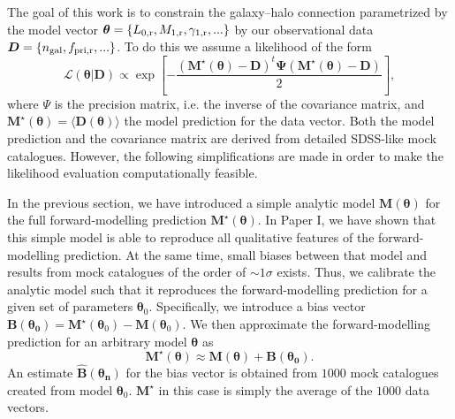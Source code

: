 \documentclass[fleqn,usenatbib,useAMS]{mnras}
\begin{document}
The goal of this work is to constrain the galaxy--halo connection parametrized by the model vector $\boldsymbol{\theta} = \{L_{0, \rm r}, M_{1, \rm r}, \gamma_{1, \rm r}, ...\}$ by our observational data $\boldsymbol{D} = \{n_{\rm gal}, f_{\rm pri, r}, ...\}$. To do this we assume a likelihood of the form
\begin{equation}
	\mathcal{L}(\boldsymbol{\theta} | \boldsymbol{D}) \propto \exp \left[ - \frac{(\boldsymbol{M}^\star (\boldsymbol{\theta}) - \boldsymbol{D})^t \boldsymbol{\Psi} (\boldsymbol{M}^\star (\boldsymbol{\theta}) - \boldsymbol{D})}{2} \right],
	\label{eq:likelihood}
\end{equation}
where $\Psi$ is the precision matrix, i.e. the inverse of the covariance matrix, and $\boldsymbol{M}^\star (\boldsymbol{\theta}) = \langle \boldsymbol{D} (\boldsymbol{\theta}) \rangle$ the model prediction for the data vector. Both the model prediction and the covariance matrix are derived from detailed SDSS-like mock catalogues. However, the following simplifications are made in order to make the likelihood evaluation computationally feasible.

In the previous section, we have introduced a simple analytic model $\boldsymbol{M} (\boldsymbol{\theta})$ for the full forward-modelling prediction $\boldsymbol{M}^\star (\boldsymbol{\theta})$. In Paper I, we have shown that this simple model is able to reproduce all qualitative features of the forward-modelling prediction. At the same time, small biases between that model and results from mock catalogues of the order of $\sim 1 \sigma$ exists. Thus, we calibrate the analytic model such that it reproduces the forward-modelling prediction for a given set of parameters $\boldsymbol{\theta}_0$. Specifically, we introduce a bias vector $\boldsymbol{B (\boldsymbol{\theta}_0)} = \boldsymbol{M}^\star (\boldsymbol{\theta}_0) - \boldsymbol{M} (\boldsymbol{\theta}_0)$. We then approximate the forward-modelling prediction for an arbitrary model $\boldsymbol{\theta}$ as
\begin{equation}
	\boldsymbol{M}^\star (\boldsymbol{\theta}) \approx \boldsymbol{M} (\boldsymbol{\theta}) + \boldsymbol{B (\boldsymbol{\theta}_0)}.
	\label{eq:model}
\end{equation}
An estimate $\boldsymbol{\hat{B} (\boldsymbol{\theta_n})}$ for the bias vector is obtained from $1000$ mock catalogues created from model $\boldsymbol{\theta}_0$. $\boldsymbol{M}^\star$ in this case is simply the average of the $1000$ data vectors.
\end{document}
